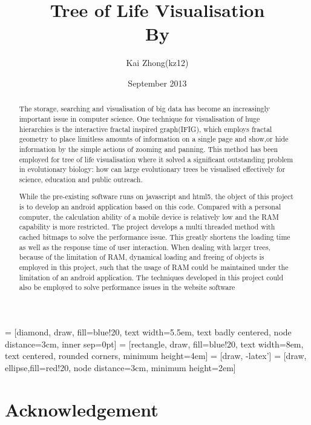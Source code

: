\documentclass[MSc]{icldt}
\title{Tree of Life Visualisation \\ By}
\author{Kai Zhong(kz12)}
\date{September 2013}
\begin{document}
\maketitle

 = [diamond, draw, fill=blue!20, 
    text width=5.5em, text badly centered, node distance=3cm, inner sep=0pt]
 = [rectangle, draw, fill=blue!20, 
    text width=8em, text centered, rounded corners, minimum height=4em]
 = [draw, -latex']
 = [draw, ellipse,fill=red!20, node distance=3cm,
    minimum height=2em]
    
\begin{abstract}

The storage, searching and visualisation of big data has become an increasingly important issue in computer science. One technique for visualisation of huge hierarchies is the interactive fractal inspired graph(IFIG), which employs fractal geometry to place limitless amounts of information on a single page and show,or  hide information by the simple actions of zooming and panning. This method has been employed for tree of life visualisation where it solved a significant outstanding problem in evolutionary biology: how can large evolutionary trees be visualised effectively for science, education and public outreach.

While the pre-existing software runs on javascript and html5, the object of this project is to develop an android application based on this code. Compared with a personal computer, the calculation ability of a mobile device is relatively low and the RAM capability is more restricted. The project develops a multi threaded method with cached bitmaps to solve the performance issue. This greatly shortens the loading time as well as the response time of user interaction. When dealing with larger trees, because of the limitation of RAM, dynamical loading and freeing of objects is employed in this project, such that the usage of RAM could be maintained under the limitation of an android application. 
The techniques developed in this project could also be employed to solve performance issues in the website software

\end{abstract}

\chapter*{Acknowledgement}

\makededication
\end{document}
